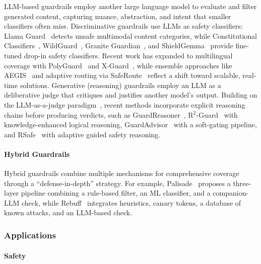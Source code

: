 LLM-based guardrails employ another large language model to evaluate and filter generated content, capturing nuance, abstraction, and intent that smaller classifiers often miss. Discriminative guardrails use LLMs as safety classifiers: Llama Guard~\citep{Inan2023LlamaGL, Chi2024LlamaG3} detects unsafe multimodal content categories, while Constitutional Classifiers~\citep{Sharma2025ConstitutionalCD}, WildGuard~\citep{Han2024WildGuardOO}, Granite Guardian~\citep{Padhi2024GraniteG}, and ShieldGemma~\citep{Zeng2024ShieldGemmaGA, Zeng2025ShieldGemma2R} provide fine-tuned drop-in safety classifiers. Recent work has expanded to multilingual coverage with PolyGuard~\citep{Kumar2025PolyGuardAM} and X-Guard~\citep{Upadhayay2025XGuardMG}, while ensemble approaches like AEGIS~\citep{Ghosh2024AEGISOA} and adaptive routing via SafeRoute~\citep{Lee2025SafeRouteAM} reflect a shift toward scalable, real-time solutions. Generative (reasoning) guardrails employ an LLM as a deliberative judge that critiques and justifies another model's output. Building on the LLM-as-a-judge paradigm~\citep{Zheng2023JudgingLW}, recent methods incorporate explicit reasoning chains before producing verdicts, such as GuardReasoner~\citep{Liu2025GuardReasonerTR}, R$^2$-Guard~\citep{Kang2024R2GuardRR} with knowledge-enhanced logical reasoning, GuardAdvisor~\citep{huang2026guardian} with a soft-gating pipeline, and RSafe~\citep{Zheng2025RSafeIP} with adaptive guided safety reasoning.

\paragraph{Hybrid Guardrails}

Hybrid guardrails combine multiple mechanisms for comprehensive coverage through a ``defense-in-depth'' strategy. For example, Palisade~\citep{Kokkula2024PalisadeP} proposes a three-layer pipeline combining a rule-based filter, an ML classifier, and a companion-LLM check, while Rebuff~\citep{Rebuff2023} integrates heuristics, canary tokens, a database of known attacks, and an LLM-based check.

\subsubsection{Applications}

\paragraph{Safety}

